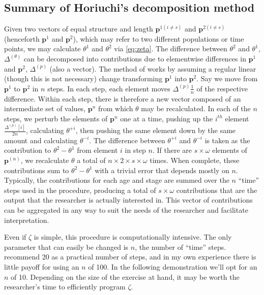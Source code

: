 \documentclass{article}
\begin{document}
\subsection{Summary of Horiuchi's decomposition method}
Given two vectors of equal structure and length $\textbf{p}^{1(i \ne s)}$ and
$\textbf{p}^{2(i \ne s)}$ (henceforth $\textbf{p}^1$ and $\textbf{p}^2$), which
may refer to two different populations or time points, we may calculate
$\theta^1$ and $\theta^2$ via \eqref{eq:zeta}.
The difference between $\theta^2$ and $\theta^1$, $\Delta^{(\theta)}$ can be
decomposed into contributions due to elementwise differences in $\textbf{p}^1$ and
$\textbf{p}^2$, $\Delta^{(p)}$ (also a vector). The method of
\citet{horiuchi2008} works by assuming a regular linear (though this is not necessary) change transforming $\textbf{p}^{1}$ into
$\textbf{p}^{2}$. Say we move from $\textbf{p}^1$ to $\textbf{p}^2$ in $n$
steps. In each step, each element moves $\Delta^{(p)} \frac{1}{n}$ of the respective difference. Within each step, there is therefore a new vector
composed of an intermediate set of values, $\textbf{p}^n$ from which $\theta$
may be recalculated. In each of the $n$ steps, we perturb the elements of
$\textbf{p}^n$ one at a time, pushing up the $i^{th}$ element
$\frac{\Delta^{(p)}[i]}{2n}$, calculating $\theta^{+i}$, then pushing the same
element down by the same amount and calculating $\theta^{-i}$. The difference between $\theta^{+i}$ and
$\theta^{-i}$ is taken as the contribution to $\theta^2-\theta^1$ from element
$i$ in step $n$. If there are $s\times\omega$ elements of
$\textbf{p}^{(n)}$, we recalculate $\theta$ a total of $n\times2\times
s\times\omega$ times. When complete, these contributions sum to
$\theta^2-\theta^1$ with a trivial error that depends mostly on $n$.
Typically, the contributions for each age and stage are summed over the $n$ ``time'' steps used in the procedure, producing a total of
$s \times \omega$ contributions that are the output that the researcher is
actually interested in. This vector of contributions can be aggregated in any
way to suit the needs of the researcher and facilitate interpretation. 

Even if $\zeta$ is simple, this procedure is computationally
intensive. The only parameter that can easily be changed is $n$, the number of
``time'' steps. \citet{horiuchi2008} recommend 20 as a practical number of
steps, and in my own experience there is little payoff for using an $n$ of 100.
In the following demonstration we'll opt for an $n$ of 10. Depending on the
size of the exercise at hand, it may be worth the researcher's time to efficiently program $\zeta$.
\end{document}
